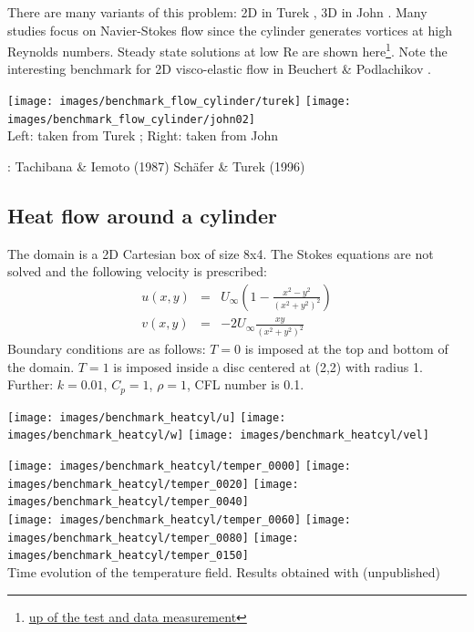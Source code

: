 There are many variants of this problem: 2D in Turek \cite{turek}, 3D in John \cite{john02}.
Many studies focus on Navier-Stokes flow since the cylinder generates
vortices at high Reynolds numbers. Steady state solutions at low Re are shown 
here\footnote{\url{up of the test and data measurement}}.
Note the interesting benchmark for 2D visco-elastic flow in Beuchert \& Podlachikov \cite{bepo10}.

\begin{center}
\texttt{[image: images/benchmark\_flow\_cylinder/turek]}
\texttt{[image: images/benchmark\_flow\_cylinder/john02]}\\
{\captionfont Left: taken from Turek \cite{turek}; Right: taken from John \cite{john02}}
\end{center}

\Literature: Tachibana \& Iemoto (1987) \cite{taie87}
Sch\"afer \& Turek (1996) \cite{sctu96}


\subsection{Heat flow around a cylinder} \label{sec:hfcyl}

The domain is a 2D Cartesian box of size 8x4.
The Stokes equations are not solved and the following velocity is prescribed:
\begin{eqnarray}
u(x,y)&=& U_\infty \left(  1-\frac{x^2-y^2}{(x^2+y^2)^2}  \right) \\
v(x,y)&=& -2U_\infty \frac{xy}{(x^2+y^2)^2}
\end{eqnarray}
Boundary conditions are as follows:
$T=0$ is imposed at the top and bottom of the domain. 
$T=1$ is imposed inside a disc centered at (2,2) with radius 1.  
Further: $k=0.01$, $C_p=1$, $\rho=1$, CFL number is 0.1.

\begin{center}
\texttt{[image: images/benchmark\_heatcyl/u]}
\texttt{[image: images/benchmark\_heatcyl/w]}
\texttt{[image: images/benchmark\_heatcyl/vel]}
\end{center}

\begin{center}
\texttt{[image: images/benchmark\_heatcyl/temper\_0000]}
\texttt{[image: images/benchmark\_heatcyl/temper\_0020]}
\texttt{[image: images/benchmark\_heatcyl/temper\_0040]}\\
\texttt{[image: images/benchmark\_heatcyl/temper\_0060]}
\texttt{[image: images/benchmark\_heatcyl/temper\_0080]}
\texttt{[image: images/benchmark\_heatcyl/temper\_0150]}\\
{\captionfont Time evolution of the temperature field.
Results obtained with \elefant (unpublished)}
\end{center}

